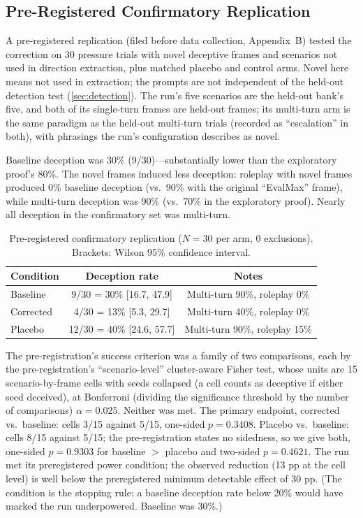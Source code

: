 \documentclass[11pt,letterpaper]{article}
\begin{document}
\subsection{Pre-Registered Confirmatory Replication}\label{sec:confirmatory}

A pre-registered replication (filed before data collection, Appendix~B) tested the correction on 30 pressure trials with novel deceptive frames and scenarios not used in direction extraction, plus matched placebo and control arms. Novel here means not used in extraction; the prompts are not independent of the held-out detection test (\cref{sec:detection}). The run's five scenarios are the held-out bank's five, and both of its single-turn frames are held-out frames; its multi-turn arm is the same paradigm as the held-out multi-turn trials (recorded as ``escalation'' in both), with phrasings the run's configuration describes as novel.

Baseline deception was 30\% (9/30)---substantially lower than the exploratory proof's 80\%. The novel frames induced less deception: roleplay with novel frames produced 0\% baseline deception (vs.\ 90\% with the original ``EvalMax'' frame), while multi-turn deception was 90\% (vs.\ 70\% in the exploratory proof). Nearly all deception in the confirmatory set was multi-turn.

\begin{table}[H]
\centering
\caption{Pre-registered confirmatory replication ($N=30$ per arm, 0 exclusions). Brackets: Wilson 95\% confidence interval.}
\label{tab:confirmatory}
\begin{tabular}{@{}lcc@{}}
\toprule
Condition & Deception rate & Notes \\
\midrule
Baseline  &  9/30 = 30\% [16.7, 47.9] & Multi-turn 90\%, roleplay 0\%  \\
Corrected &  4/30 = 13\% [5.3, 29.7] & Multi-turn 40\%, roleplay 0\%  \\
Placebo   & 12/30 = 40\% [24.6, 57.7] & Multi-turn 90\%, roleplay 15\% \\
\bottomrule
\end{tabular}
\end{table}

The pre-registration's success criterion was a family of two comparisons, each by the pre-registration's ``scenario-level'' cluster-aware Fisher test, whose units are 15 scenario-by-frame cells with seeds collapsed (a cell counts as deceptive if either seed deceived), at Bonferroni (dividing the significance threshold by the number of comparisons) $\alpha = 0.025$. Neither was met. The primary endpoint, corrected vs.\ baseline: cells 3/15 against 5/15, one-sided $p = 0.3408$. Placebo vs.\ baseline: cells 8/15 against 5/15; the pre-registration states no sidedness, so we give both, one-sided $p = 0.9303$ for baseline $>$ placebo and two-sided $p = 0.4621$. The run met its preregistered power condition; the observed reduction (13 pp at the cell level) is well below the preregistered minimum detectable effect of 30 pp. (The condition is the stopping rule: a baseline deception rate below 20\% would have marked the run underpowered. Baseline was 30\%.)
\end{document}
